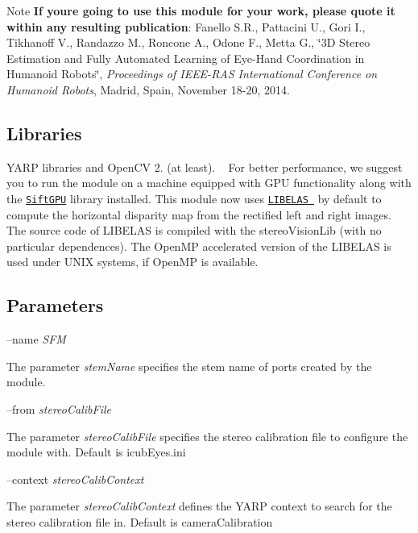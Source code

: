 \begin{DoxyNote}{Note}
{\bfseries If you\textquotesingle{}re going to use this module for your work, please quote it within any resulting publication}\+: Fanello S.\+R., Pattacini U., Gori I., Tikhanoff V., Randazzo M., Roncone A., Odone F., Metta G., \char`\"{}3\+D Stereo Estimation and Fully Automated
      Learning of Eye-\/\+Hand Coordination in Humanoid Robots\char`\"{}, {\itshape Proceedings of I\+E\+E\+E-\/\+R\+AS International Conference on Humanoid Robots}, Madrid, Spain, November 18-\/20, 2014.
\end{DoxyNote}
\hypertarget{group__SFM_lib_sec}{}\subsection{Libraries}\label{group__SFM_lib_sec}
Y\+A\+RP libraries and Open\+CV 2. (at least). ~\newline
For better performance, we suggest you to run the module on a machine equipped with G\+PU functionality along with the \href{http://cs.unc.edu/~ccwu/siftgpu}{\tt Sift\+G\+PU} library installed. This module now uses \href{http://www.cvlibs.net/software/libelas/}{\tt L\+I\+B\+E\+L\+AS } by default to compute the horizontal disparity map from the rectified left and right images. The source code of L\+I\+B\+E\+L\+AS is compiled with the stereo\+Vision\+Lib (with no particular dependences). The Open\+MP accelerated version of the L\+I\+B\+E\+L\+AS is used under U\+N\+IX systems, if Open\+MP is available.\hypertarget{group__SFM_parameters_sec}{}\subsection{Parameters}\label{group__SFM_parameters_sec}
--name {\itshape S\+FM} 
\begin{DoxyItemize}
\item The parameter {\itshape stem\+Name} specifies the stem name of ports created by the module.
\end{DoxyItemize}

--from {\itshape stereo\+Calib\+File} 
\begin{DoxyItemize}
\item The parameter {\itshape stereo\+Calib\+File} specifies the stereo calibration file to configure the module with. Default is icub\+Eyes.\+ini
\end{DoxyItemize}

--context {\itshape stereo\+Calib\+Context} 
\begin{DoxyItemize}
\item The parameter {\itshape stereo\+Calib\+Context} defines the Y\+A\+RP context to search for the stereo calibration file in. Default is camera\+Calibration
\end{DoxyItemize}

